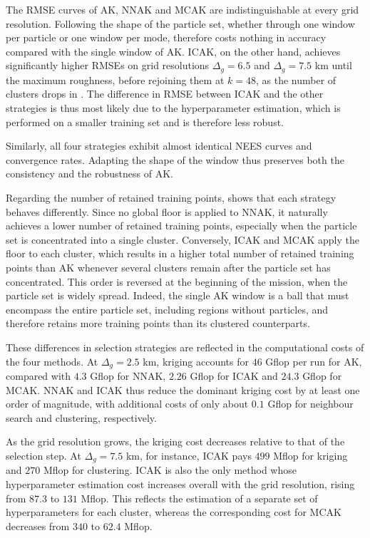 The RMSE curves of AK, NNAK and MCAK are indistinguishable at every grid resolution. Following the shape of the particle set, whether through one window per particle or one window per mode, therefore costs nothing in accuracy compared with the single window of AK. ICAK, on the other hand, achieves significantly higher RMSEs on grid resolutions $\Delta_g=6.5$ and $\Delta_g=7.5$ km until the maximum roughness, before rejoining them at $k=48$, as the number of clusters drops in . The difference in RMSE between ICAK and the other strategies is thus most likely due to the hyperparameter estimation, which is performed on a smaller training set and is therefore less robust.

Similarly, all four strategies exhibit almost identical NEES curves and convergence rates. Adapting the shape of the window thus preserves both the consistency and the robustness of AK.

Regarding the number of retained training points,  shows that each strategy behaves differently. Since no global floor is applied to NNAK, it naturally achieves a lower number of retained training points, especially when the particle set is concentrated into a single cluster. Conversely, ICAK and MCAK apply the floor to each cluster, which results in a higher total number of retained training points than AK whenever several clusters remain after the particle set has concentrated. This order is reversed at the beginning of the mission, when the particle set is widely spread. Indeed, the single AK window is a ball that must encompass the entire particle set, including regions without particles, and therefore retains more training points than its clustered counterparts.

These differences in selection strategies are reflected in the computational costs of the four methods. At $\Delta_g=2.5$ km, kriging accounts for $46$ Gflop per run for AK, compared with $4.3$ Gflop for NNAK, $2.26$ Gflop for ICAK and $24.3$ Gflop for MCAK. NNAK and ICAK thus reduce the dominant kriging cost by at least one order of magnitude, with additional costs of only about $0.1$ Gflop for neighbour search and clustering, respectively.

As the grid resolution grows, the kriging cost decreases relative to that of the selection step. At $\Delta_g=7.5$ km, for instance, ICAK pays $499$ Mflop for kriging and $270$ Mflop for clustering. ICAK is also the only method whose hyperparameter estimation cost increases overall with the grid resolution, rising from $87.3$ to $131$ Mflop. This reflects the estimation of a separate set of hyperparameters for each cluster, whereas the corresponding cost for MCAK decreases from $340$ to $62.4$ Mflop.

